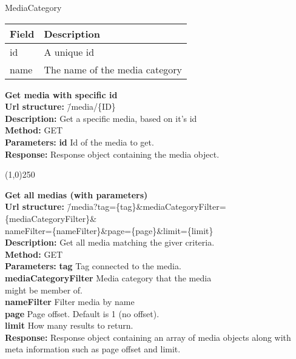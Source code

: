 \documentclass[11pt]{article}
\begin{document}
MediaCategory

\begin{center}
\begin{tabular}{|l|l|}
\hline
 Field  &  Description                     \\
\hline
 id     &  A unique id                     \\
 name   &  The name of the media category  \\
\hline
\end{tabular}
\end{center}

\begin{tabbing}
\textbf{Get media with specific id} \\
\textcolor{black!60}{\textbf{Url structure:}} \hspace{0.2in} \= /media/\{ID\} \\
\textcolor{black!60}{\textbf{Description:}}  \> Get a specific media, based on it's id \\
\textcolor{black!60}{\textbf{Method:}} \> GET \\
\textcolor{black!60}{\textbf{Parameters:}} \> \textbf{id} Id of the media to get. \\
\textcolor{black!60}{\textbf{Response:}} \> Response object containing the media object.
\end{tabbing}

\begin{center}\line(1,0){250}\end{center}

\begin{tabbing}
\textbf{Get all medias (with parameters)} \\
\textcolor{black!60}{\textbf{Url structure:}} \hspace{0.2in} \= /media?tag=\{tag\}\&mediaCategoryFilter=\{mediaCategoryFilter\}\& \\
\> nameFilter=\{nameFilter\}\&page=\{page\}\&limit=\{limit\} \\
\textcolor{black!60}{\textbf{Description:}}  \> Get all media matching the giver criteria. \\
\textcolor{black!60}{\textbf{Method:}} \> GET \\
\textcolor{black!60}{\textbf{Parameters:}} \> \textbf{tag} Tag connected to the media. \\
\> \textbf{mediaCategoryFilter} Media category that the media \\
\> might be member of. \\
\> \textbf{nameFilter} Filter media by name \\
\> \textbf{page} Page offset. Default is 1 (no offset). \\
\> \textbf{limit} How many results to return. \\
\textcolor{black!60}{\textbf{Response:}} \> Response object containing an array of media objects along with \\
\> meta information such as page offset and limit.
\end{tabbing}
\end{document}
